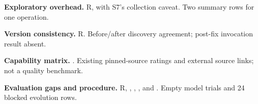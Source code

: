 \begin{description}[leftmargin=10mm,labelwidth=8mm,itemsep=7pt]
\item[S11] \textbf{Exploratory overhead.} R, with S7's collection caveat. Two summary rows for one operation.
\item[S12] \textbf{Version consistency.} R. Before/after discovery agreement; post-fix invocation result absent.
\item[S13] \textbf{Capability matrix.} . Existing pinned-source ratings and external source links; not a quality benchmark.
\item[S14] \textbf{Evaluation gaps and procedure.} R, , , , and . Empty model trials and 24 blocked evolution rows.
\end{description}
\endgroup
